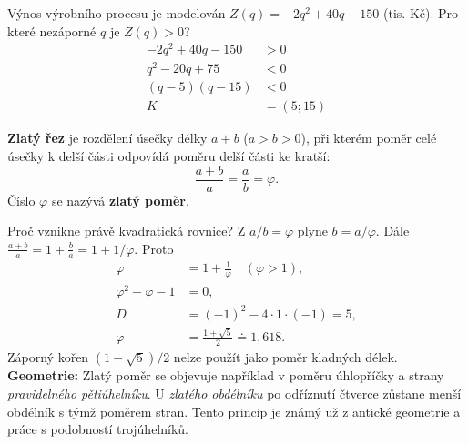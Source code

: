 \documentclass[11pt,a4paper]{article}
\begin{document}
\begin{zadaniReseniBox}[title={Samostatná práce 2}]
Výnos výrobního procesu je modelován $Z(q)=-2q^2+40q-150$ (tis. Kč). Pro které nezáporné $q$ je $Z(q)>0$?
\tcblower
\[
\begin{aligned}
-2q^2+40q-150&>0\\[2pt]
q^2-20q+75&<0\\[2pt]
(q-5)(q-15)&<0\\[2pt]
K&=(5;15)
\end{aligned}
\]
\end{zadaniReseniBox}

\begin{definiceBox}[title={Definice - Zlatý řez}]
\textbf{Zlatý řez} je rozdělení úsečky délky $a+b$ ($a>b>0$),
při kterém poměr celé úsečky k delší části odpovídá poměru delší části ke kratší:
\[\frac{a+b}{a}=\frac ab=\varphi.\]
Číslo $\varphi$ se nazývá \textbf{zlatý poměr}.
\end{definiceBox}
\begin{center}
\end{center}
Proč vznikne právě kvadratická rovnice? Z $a/b=\varphi$ plyne
$b=a/\varphi$. Dále $\frac{a+b}{a}=1+\frac b a=1+1/\varphi$.
Proto
\[
\begin{aligned}
\varphi&=1+\frac1\varphi\quad(\varphi>1),\\
\varphi^2-\varphi-1&=0,\\
D&=(-1)^2-4\cdot1\cdot(-1)=5,\\
\varphi&=\frac{1+\sqrt5}{2}\doteq1{,}618.
\end{aligned}
\]
Záporný kořen $(1-\sqrt5)/2$ nelze použít jako poměr kladných délek.
\textbf{Geometrie:} Zlatý poměr se objevuje například v poměru úhlopříčky a strany
\emph{pravidelného pětiúhelníku}. U \emph{zlatého obdélníku} po odříznutí čtverce
zůstane menší obdélník s týmž poměrem stran. Tento princip je známý už
z antické geometrie a práce s podobností trojúhelníků.
\end{document}
